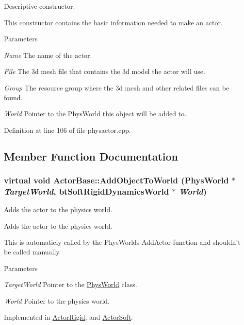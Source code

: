 Descriptive constructor. 

This constructor contains the basic information needed to make an actor. 
\begin{DoxyParams}{Parameters}
\item[{\em Name}]The name of the actor. \item[{\em File}]The 3d mesh file that contains the 3d model the actor will use. \item[{\em Group}]The resource group where the 3d mesh and other related files can be found. \item[{\em World}]Pointer to the \hyperlink{classPhysWorld}{PhysWorld} this object will be added to. \end{DoxyParams}


Definition at line 106 of file physactor.cpp.



\subsection{Member Function Documentation}
\hypertarget{classActorBase_a1af82a2ed960fd114518fdf84d5ff146}{
\subsubsection[{AddObjectToWorld}]{\setlength{\rightskip}{0pt plus 5cm}virtual void ActorBase::AddObjectToWorld ({\bf PhysWorld} $\ast$ {\em TargetWorld}, \/  btSoftRigidDynamicsWorld $\ast$ {\em World})}}
\label{dd/d7b/classActorBase_a1af82a2ed960fd114518fdf84d5ff146}


Adds the actor to the physics world. 

Adds the actor to the physics world. \par
 This is automaticly called by the PhysWorlds AddActor function and shouldn't be called manually. 
\begin{DoxyParams}{Parameters}
\item[{\em TargetWorld}]Pointer to the \hyperlink{classPhysWorld}{PhysWorld} class. \item[{\em World}]Pointer to the physics world. \end{DoxyParams}


Implemented in \hyperlink{classActorRigid_ac6d7e05944623329f0c2140c19e2c49e}{ActorRigid}, and \hyperlink{classActorSoft_a0def29f28ed4d126a0634ddc97e33e2f}{ActorSoft}.

